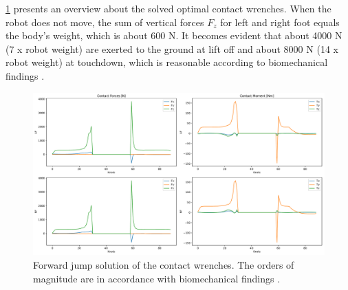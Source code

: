 \cref{fig:jumpForward_ContactWrenches} presents an overview about the solved optimal contact wrenches. When the robot does not move, the sum of vertical forces $F_z$ for left and right foot equals the body's weight, which is about 600 N. It becomes evident that about 4000 N (7 x robot weight) are exerted to the ground at lift off and about 8000 N (14 x robot weight) at touchdown, which is reasonable according to biomechanical findings \cite{meghdari2002dynamical}.
\begin{figure}[h!]
\centering	
\includegraphics[width=1\textwidth]{fig/jumpForward/ContactWrenches}
\caption[Forward jump solution of the contact wrenches]{Forward jump solution of the contact wrenches. The orders of magnitude are in accordance with biomechanical findings \cite{meghdari2002dynamical}.}
\label{fig:jumpForward_ContactWrenches}
\end{figure} 

